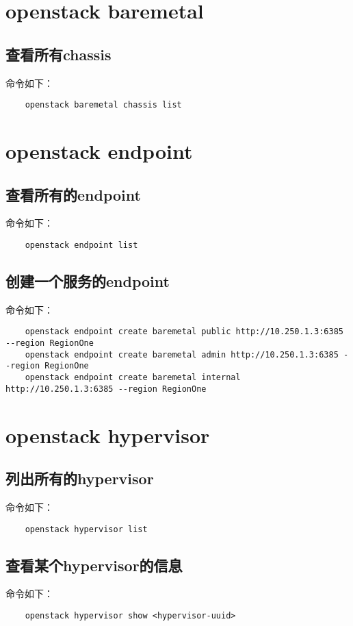 \documentclass[a4paper,left=1.5cm,right=1.5cm,11pt]{article}
\begin{document}
\tableofcontents

\clearpage

\section{openstack baremetal}
\subsection{查看所有chassis}
	命令如下：
	\begin{lstlisting}
	openstack baremetal chassis list
	\end{lstlisting}

\section{openstack endpoint}
\subsection{查看所有的endpoint}
	命令如下：
	\begin{lstlisting}
	openstack endpoint list
	\end{lstlisting}

\subsection{创建一个服务的endpoint}
	命令如下：
	\begin{lstlisting}
	openstack endpoint create baremetal public http://10.250.1.3:6385 --region RegionOne
	openstack endpoint create baremetal admin http://10.250.1.3:6385 --region RegionOne
	openstack endpoint create baremetal internal http://10.250.1.3:6385 --region RegionOne
	\end{lstlisting}

\section{openstack hypervisor}
\subsection{列出所有的hypervisor}
	命令如下：
	\begin{lstlisting}
	openstack hypervisor list
	\end{lstlisting}

\subsection{查看某个hypervisor的信息}
	命令如下：
	\begin{lstlisting}
	openstack hypervisor show <hypervisor-uuid>
	\end{lstlisting}
\end{document}
